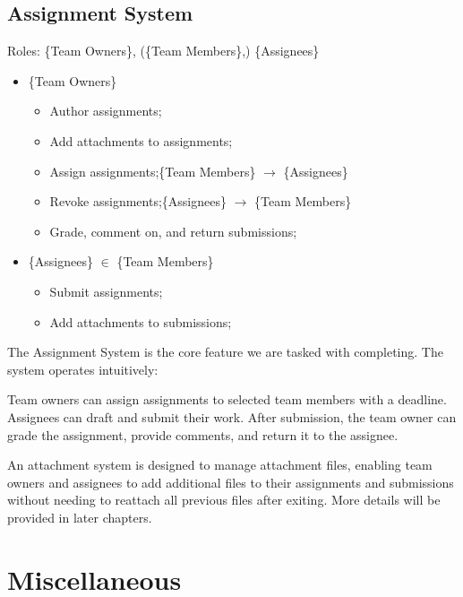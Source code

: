 \documentclass[12pt]{report}
\newcommand{\n}{\par}
\newcommand{\br}{\n\vspace{1 em}\n}
\begin{document}
\subsection{Assignment System} \label{overview.project-objectives.assignment-system}
Roles: \{Team Owners\}, (\{Team Members\},) \{Assignees\}\n
\begin{itemize}
	\item \{Team Owners\}
	      \begin{itemize}
		      \item Author assignments;
		      \item Add attachments to assignments;
		      \item Assign assignments;\null\hfill \{Team Members\} $\rightarrow$ \{Assignees\}
		      \item Revoke assignments;\null\hfill \{Assignees\} $\rightarrow$ \{Team Members\}
		      \item Grade, comment on, and return submissions;
	      \end{itemize}
	\item \{Assignees\} $\in$ \{Team Members\}
	      \begin{itemize}
		      \item Submit assignments;
		      \item Add attachments to submissions;
	      \end{itemize}
\end{itemize}\n
The Assignment System is the core feature we are tasked with completing. The system operates intuitively:\n
Team owners can assign assignments to selected team members with a deadline.
Assignees can draft and submit their work.
After submission, the team owner can grade the assignment, provide comments, and return it to the assignee.
\br
An attachment system is designed to manage attachment files,
enabling team owners and assignees to add additional files to their assignments and submissions without needing to reattach all previous files after exiting.
More details will be provided in later chapters.



\section{Miscellaneous} \label{overview.miscellaneous}
\end{document}
